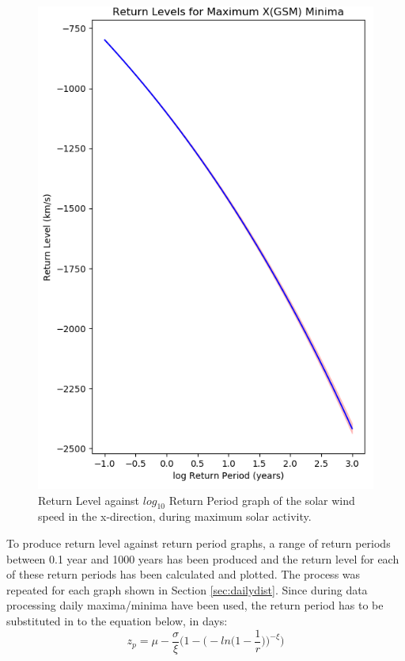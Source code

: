\documentclass[11pt]{article}
\begin{document}
\begin{figure}[t!]
\begin{minipage}{0.48\textwidth}
                \includegraphics[width=\textwidth]{fig_method/SWEmaxXminReturn.png}
                \caption{Return Level against $log_{10}$ Return Period graph of the solar wind speed in the x-direction, during maximum solar activity.}
                \label{fig:SWEmaxXminReturn}
            \end{minipage}
        \end{figure}
        To produce return level against return period graphs, a range of return periods between 0.1 year and 1000 years has been produced and the return level for each of these return periods has been calculated and plotted. The process was repeated for each graph shown in Section \ref{sec:dailydist}.
        Since during data processing daily maxima/minima have been used, the return period has to be substituted in to the equation below, in days:
        \begin{equation}
            z_p = \mu-\frac{\sigma}{\xi}\Bigg( 1-\Bigg( -ln\Bigg( 1-\frac{1}{r}\Bigg) \Bigg) ^{-\xi}\Bigg)
        \end{equation}
\end{document}
